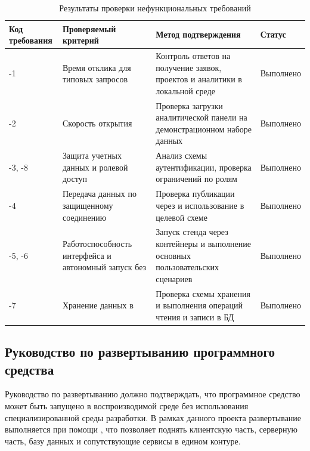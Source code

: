 \begin{table}[H]
    \caption{Результаты проверки нефункциональных требований}
    \label{tab:nonfunctional-requirements-testing}
    {\small
    \setlength{\tabcolsep}{3pt}
    \begin{tabularx}{\textwidth}{|P{0.12\textwidth}|P{0.24\textwidth}|L|P{0.10\textwidth}|}
        \hline
        Код требования & Проверяемый критерий & Метод подтверждения & Статус \\
        \hline
        -1 & Время отклика  для типовых запросов & Контроль ответов на получение заявок, проектов и аналитики в локальной среде & Выполнено \\
        \hline
        -2 & Скорость открытия  & Проверка загрузки аналитической панели на демонстрационном наборе данных & Выполнено \\
        \hline
        -3, -8 & Защита учетных данных и ролевой доступ & Анализ схемы аутентификации, проверка ограничений по ролям & Выполнено \\
        \hline
        -4 & Передача данных по защищенному соединению & Проверка публикации через  и использование  в целевой схеме & Выполнено \\
        \hline
        -5, -6 & Работоспособность интерфейса и автономный запуск без  & Запуск стенда через контейнеры и выполнение основных пользовательских сценариев & Выполнено \\
        \hline
        -7 & Хранение данных в  & Проверка схемы хранения и выполнения операций чтения и записи в БД & Выполнено \\
        \hline
    \end{tabularx}
    }
\end{table}

\subsection{Руководство по развертыванию программного средства}

Руководство по развертыванию должно подтверждать, что программное средство может быть запущено в воспроизводимой среде без использования специализированной среды разработки. В рамках данного проекта развертывание выполняется при помощи , что позволяет поднять клиентскую часть, серверную часть, базу данных и сопутствующие сервисы в едином контуре.

